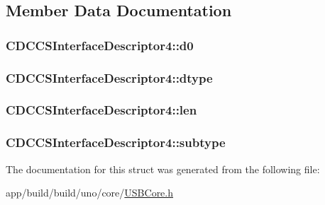 \subsection{Member Data Documentation}
\hypertarget{struct_c_d_c_c_s_interface_descriptor4_ad89b10b6c73a0c8c5df3fe5aae322957}{
\subsubsection[{d0}]{ C\-D\-C\-C\-S\-Interface\-Descriptor4\-::d0}}\label{struct_c_d_c_c_s_interface_descriptor4_ad89b10b6c73a0c8c5df3fe5aae322957}
\hypertarget{struct_c_d_c_c_s_interface_descriptor4_a17152b2ca4d4535c5f9213c75765f117}{
\subsubsection[{dtype}]{ C\-D\-C\-C\-S\-Interface\-Descriptor4\-::dtype}}\label{struct_c_d_c_c_s_interface_descriptor4_a17152b2ca4d4535c5f9213c75765f117}
\hypertarget{struct_c_d_c_c_s_interface_descriptor4_ab89f7893f8e283d7f1fb84e43893766e}{
\subsubsection[{len}]{ C\-D\-C\-C\-S\-Interface\-Descriptor4\-::len}}\label{struct_c_d_c_c_s_interface_descriptor4_ab89f7893f8e283d7f1fb84e43893766e}
\hypertarget{struct_c_d_c_c_s_interface_descriptor4_a4cc0147f4d3e90e2c17a830ea5eff849}{
\subsubsection[{subtype}]{ C\-D\-C\-C\-S\-Interface\-Descriptor4\-::subtype}}\label{struct_c_d_c_c_s_interface_descriptor4_a4cc0147f4d3e90e2c17a830ea5eff849}


The documentation for this struct was generated from the following file\-:\begin{DoxyCompactItemize}
\item 
app/build/build/uno/core/\hyperlink{_u_s_b_core_8h}{U\-S\-B\-Core.\-h}\end{DoxyCompactItemize}
